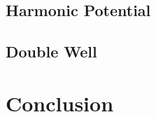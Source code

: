 \documentclass[
    parskip=half, 
    twoside=false,
    twocolumn=true,
    fontsize=11pt,
]{scrarticle}
\begin{document}
\subsection{Harmonic Potential}

\subsection{Double Well}


\pagebreak
\section{Conclusion}


\nocite{*}
\printbibliography
\end{document}
